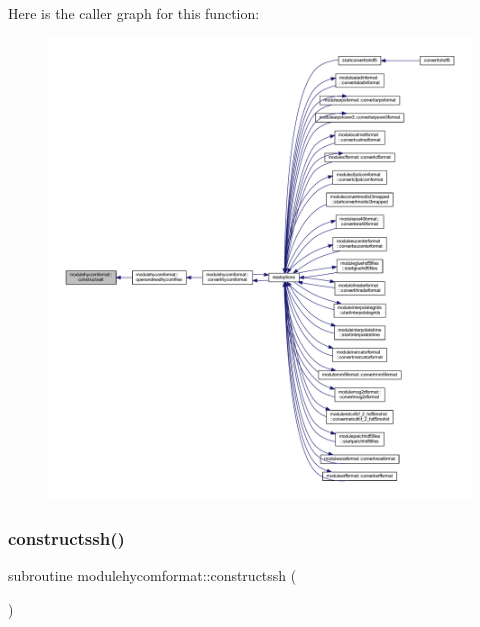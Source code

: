 Here is the caller graph for this function\+:\nopagebreak
\begin{figure}[H]
\begin{center}
\leavevmode
\includegraphics[width=350pt]{namespacemodulehycomformat_a4e0166792e4a82d98b34a54327ca161b_icgraph}
\end{center}
\end{figure}
\mbox{\label{namespacemodulehycomformat_accd71877c333ad8cebf0e4bd5b0f16d1}} 
\subsubsection{\texorpdfstring{constructssh()}{constructssh()}}
{\footnotesize\ttfamily subroutine modulehycomformat\+::constructssh (\begin{DoxyParamCaption}{ }\end{DoxyParamCaption})\hspace{0.3cm}{\ttfamily [private]}}

